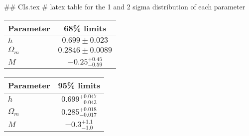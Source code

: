 ## CIs.tex
# latex table for the 1 and 2 sigma distribution of each parameter

\begin{tabular} { l  c}
 Parameter &  68\% limits\\
\hline
{\boldmath$h              $} & $0.699\pm 0.023            $\\
{\boldmath$\Omega_m       $} & $0.2846\pm 0.0089          $\\
{\boldmath$M              $} & $-0.25^{+0.45}_{-0.59}     $\\
\hline
\end{tabular}

\begin{tabular} { l  c}
 Parameter &  95\% limits\\
\hline
{\boldmath$h              $} & $0.699^{+0.047}_{-0.043}   $\\
{\boldmath$\Omega_m       $} & $0.285^{+0.018}_{-0.017}   $\\
{\boldmath$M              $} & $-0.3^{+1.1}_{-1.0}        $\\
\hline
\end{tabular}
